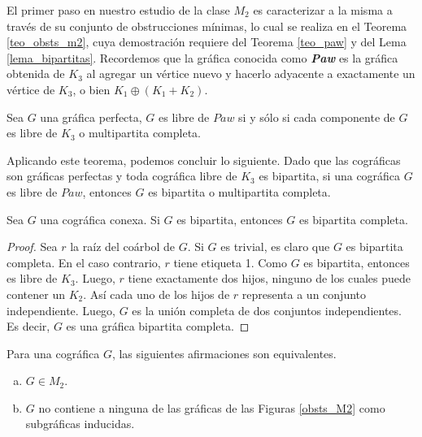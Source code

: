 El primer paso en nuestro estudio de la clase $M_2$ es caracterizar a la
misma a través de su conjunto de obstrucciones mínimas, lo cual se realiza 
en el Teorema \ref{teo_obsts_m2}, cuya demostración requiere del Teorema
\ref{teo_paw} y del Lema \ref{lema_bipartitas}. Recordemos que
la gr\'afica conocida como \textbf{\emph{Paw}} es la gr\'afica obtenida de
$K_3$ al agregar un v\'ertice nuevo y hacerlo adyacente a exactamente un
v\'ertice de $K_3$, o bien $K_1 \oplus (K_1 + K_2)$.

\begin{theorem} \label{teo_paw}
	Sea $G$ una gráfica perfecta, $G$ es libre de $Paw$ si y sólo si cada componente de $G$ es libre de $K_3$ o multipartita completa.
\end{theorem}

Aplicando este teorema, podemos concluir lo siguiente. Dado que las cográficas son gráficas perfectas y toda cográfica libre de $K_3$ es bipartita, si una cográfica $G$ es libre de $Paw$, entonces $G$ es bipartita o multipartita completa.

\begin{lemma} \label{lema_bipartitas}
Sea $G$ una cográfica conexa. Si $G$ es bipartita, entonces $G$ es bipartita completa.
\end{lemma}

\begin{proof}
Sea $r$ la raíz del coárbol de $G$. Si $G$ es trivial, es claro que $G$ es bipartita completa. En el caso contrario, $r$ tiene etiqueta 1. Como $G$ es bipartita, entonces es libre de $K_3$. Luego, $r$ tiene exactamente dos hijos, ninguno de los cuales puede contener un $K_2$. Así cada uno de los hijos de $r$ representa a un conjunto independiente. Luego, $G$ es la unión completa de dos conjuntos independientes. Es decir, $G$ es una gráfica bipartita completa.
\end{proof}

\begin{theorem} \label{teo_obsts_m2}

    Para una cográfica $G$, las siguientes afirmaciones son equivalentes.
    \begin{enumerate}[(a)]
        \item $G \in M_2$.
        \item $G$ no contiene a ninguna de las gráficas de las Figuras \ref{obsts_M2} como subgráficas inducidas.
    \end{enumerate}

\end{theorem}


